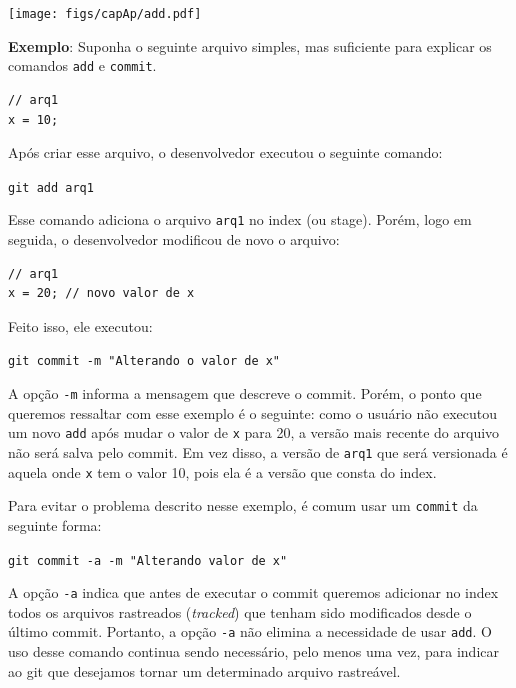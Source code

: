 \documentclass[
  11pt,
  twoside]{book}
\newcommand{\passthrough}[1]{#1}
\let\origfigure\figure
\let\endorigfigure\endfigure
\renewenvironment{figure}[1][2] {
    \expandafter\origfigure\expandafter[!h]
} {
    \endorigfigure
}
\begin{document}
\begin{figure}
\centering
\texttt{[image: figs/capAp/add.pdf]}
\caption{Comandos \passthrough{\lstinline!add!} e
\passthrough{\lstinline!commit!}}
\end{figure}

\textbf{Exemplo}: Suponha o seguinte arquivo simples, mas suficiente
para explicar os comandos \passthrough{\lstinline!add!} e
\passthrough{\lstinline!commit!}.

\begin{lstlisting}
// arq1 
x = 10; 
\end{lstlisting}

Após criar esse arquivo, o desenvolvedor executou o seguinte comando:

\passthrough{\lstinline!git add arq1!}

Esse comando adiciona o arquivo \passthrough{\lstinline!arq1!} no index
(ou stage). Porém, logo em seguida, o desenvolvedor modificou de novo o
arquivo:

\begin{lstlisting}
// arq1
x = 20; // novo valor de x
\end{lstlisting}

Feito isso, ele executou:

\passthrough{\lstinline!git commit -m "Alterando o valor de x"!}

A opção \passthrough{\lstinline!-m!} informa a mensagem que descreve o
commit. Porém, o ponto que queremos ressaltar com esse exemplo é o
seguinte: como o usuário não executou um novo
\passthrough{\lstinline!add!} após mudar o valor de
\passthrough{\lstinline!x!} para 20, a versão mais recente do arquivo
não será salva pelo commit. Em vez disso, a versão de
\passthrough{\lstinline!arq1!} que será versionada é aquela onde
\passthrough{\lstinline!x!} tem o valor 10, pois ela é a versão que
consta do index.

Para evitar o problema descrito nesse exemplo, é comum usar um
\passthrough{\lstinline!commit!} da seguinte forma:

\passthrough{\lstinline!git commit -a -m "Alterando valor de x"!}

A opção \passthrough{\lstinline!-a!} indica que antes de executar o
commit queremos adicionar no index todos os arquivos rastreados
(\emph{tracked}) que tenham sido modificados desde o último commit.
Portanto, a opção \passthrough{\lstinline!-a!} não elimina a necessidade
de usar \passthrough{\lstinline!add!}. O uso desse comando continua
sendo necessário, pelo menos uma vez, para indicar ao git que desejamos
tornar um determinado arquivo rastreável.
\end{document}
